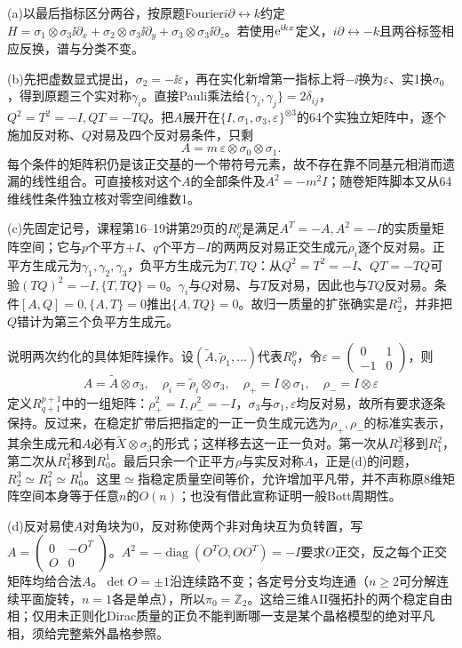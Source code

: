 \begin{solution}
(a)以最后指标区分两谷，按原题Fourier$i\partial\leftrightarrow k$约定$H=\sigma_1\otimes\sigma_3\ii\partial_x+\sigma_2\otimes\sigma_3\ii\partial_y+\sigma_3\otimes\sigma_3\ii\partial_z$。若使用$\mathrm e^{\mathrm i kx}$定义，$i\partial\leftrightarrow-k$且两谷标签相应反换，谱与分类不变。

(b)先把虚数显式提出，$\sigma_2=-\ii\varepsilon$，再在实化新增第一指标上将$-\ii$换为$\varepsilon$、实1换$\sigma_0$，得到原题三个实对称$\gamma_i$。直接Pauli乘法给$\{\gamma_i,\gamma_j\}=2\delta_{ij}$，$Q^2=T^2=-I,QT=-TQ$。把$A$展开在$\{I,\sigma_1,\sigma_3,\varepsilon\}^{\otimes3}$的64个实独立矩阵中，逐个施加反对称、$Q$对易及四个反对易条件，只剩
\begin{equation}
A=m\,\varepsilon\otimes\sigma_0\otimes\sigma_1.
\end{equation}
每个条件的矩阵积仍是该正交基的一个带符号元素，故不存在靠不同基元相消而遗漏的线性组合。可直接核对这个$A$的全部条件及$A^2=-m^2I$；随卷矩阵脚本又从64维线性条件独立核对零空间维数1。

(c)先固定记号，课程第16--19讲第29页的$R_q^p$是满足$A^T=-A,A^2=-I$的实质量矩阵空间；它与$p$个平方$+I$、$q$个平方$-I$的两两反对易正交生成元$\rho_i$逐个反对易。正平方生成元为$\gamma_1,\gamma_2,\gamma_3$，负平方生成元为$T,TQ$：从$Q^2=T^2=-I$、$QT=-TQ$可验$(TQ)^2=-I,\{T,TQ\}=0$。$\gamma_i$与$Q$对易、与$T$反对易，因此也与$TQ$反对易。条件$[A,Q]=0,\{A,T\}=0$推出$\{A,TQ\}=0$。故归一质量的扩张确实是$R_2^3$，并非把$Q$错计为第三个负平方生成元。

说明两次约化的具体矩阵操作。设$(\widetilde A,\widetilde\rho_1,\ldots)$代表$R_q^p$，令$\varepsilon=\left(\begin{smallmatrix}0&1\\-1&0\end{smallmatrix}\right)$，则
\begin{equation}
A=\widetilde A\otimes\sigma_3,\quad
\rho_i=\widetilde\rho_i\otimes\sigma_3,\quad
\rho_+=I\otimes\sigma_1,\quad
\rho_-=I\otimes\varepsilon
\end{equation}
定义$R_{q+1}^{p+1}$中的一组矩阵：$\rho_+^2=I,\rho_-^2=-I$，$\sigma_3$与$\sigma_1,\varepsilon$均反对易，故所有要求逐条保持。反过来，在稳定扩带后把指定的一正一负生成元选为$\rho_+,\rho_-$的标准实表示，其余生成元和$A$必有$\widetilde X\otimes\sigma_3$的形式；这样移去这一正一负对。第一次从$R_2^3$移到$R_1^2$，第二次从$R_1^2$移到$R_0^1$。最后只余一个正平方$\rho$与实反对称$A$，正是(d)的问题，$R_2^3\simeq R_1^2\simeq R_0^1$。这里$\simeq$指稳定质量空间等价，允许增加平凡带，并不声称原8维矩阵空间本身等于任意$n$的$O(n)$；也没有借此宣称证明一般Bott周期性。

(d)反对易使$A$对角块为0，反对称使两个非对角块互为负转置，写$A=\left(\begin{smallmatrix}0&-O^T\\O&0\end{smallmatrix}\right)$。$A^2=-\operatorname{diag}(O^TO,OO^T)=-I$要求$O$正交，反之每个正交矩阵均给合法$A$。$\det O=\pm1$沿连续路不变；各定号分支均连通（$n\ge2$可分解连续平面旋转，$n=1$各是单点），所以$\pi_0=\mathbb Z_2$。这给三维AII强拓扑的两个稳定自由相；仅用未正则化Dirac质量的正负不能判断哪一支是某个晶格模型的绝对平凡相，须给完整紫外晶格参照。
\end{solution}
